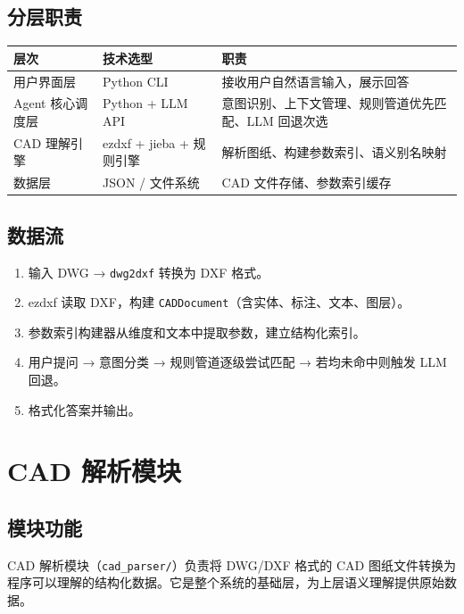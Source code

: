\documentclass[11pt,a4paper]{article}
\begin{document}
\subsection{分层职责}

\begin{table}[H]
\centering
\small
\begin{tabular}{llp{7cm}}
\toprule
层次 & 技术选型 & 职责 \\
\midrule
用户界面层 & Python CLI & 接收用户自然语言输入，展示回答 \\
Agent 核心调度层 & Python + LLM API & 意图识别、上下文管理、规则管道优先匹配、LLM 回退次选 \\
CAD 理解引擎 & ezdxf + jieba + 规则引擎 & 解析图纸、构建参数索引、语义别名映射 \\
数据层 & JSON / 文件系统 & CAD 文件存储、参数索引缓存 \\
\bottomrule
\end{tabular}
\end{table}

\subsection{数据流}

\begin{enumerate}[nosep]
  \item 输入 DWG → \texttt{dwg2dxf} 转换为 DXF 格式。
  \item ezdxf 读取 DXF，构建 \texttt{CADDocument}（含实体、标注、文本、图层）。
  \item 参数索引构建器从维度和文本中提取参数，建立结构化索引。
  \item 用户提问 → 意图分类 → 规则管道逐级尝试匹配 → 若均未命中则触发 LLM 回退。
  \item 格式化答案并输出。
\end{enumerate}

\section{CAD 解析模块}

\subsection{模块功能}

CAD 解析模块（\texttt{cad\_parser/}）负责将 DWG/DXF 格式的 CAD 图纸文件转换为程序可以理解的结构化数据。它是整个系统的基础层，为上层语义理解提供原始数据。
\end{document}
